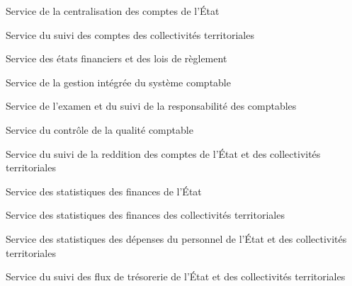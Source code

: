 \documentclass[a4paper,12pt,oneside]{report}
\begin{document}
{
\begin{svc}
\item Service de la centralisation des comptes de l'État
\item Service du suivi des comptes des collectivités territoriales
\item Service des états financiers et des lois de règlement
\item Service de la gestion intégrée du système comptable
\end{svc}
\begin{svc}
\item Service de l'examen et du suivi de la responsabilité des comptables
\item Service du contrôle de la qualité comptable
\item Service du suivi de la reddition des comptes de l'État et des collectivités territoriales
\end{svc}
\begin{svc}
\item Service des statistiques des finances de l'État
\item Service des statistiques des finances des collectivités territoriales
\item Service des statistiques des dépenses du personnel de l'État et des collectivités territoriales
\item Service du suivi des flux de trésorerie de l'État et des collectivités territoriales
\end{svc}

}
\end{document}
